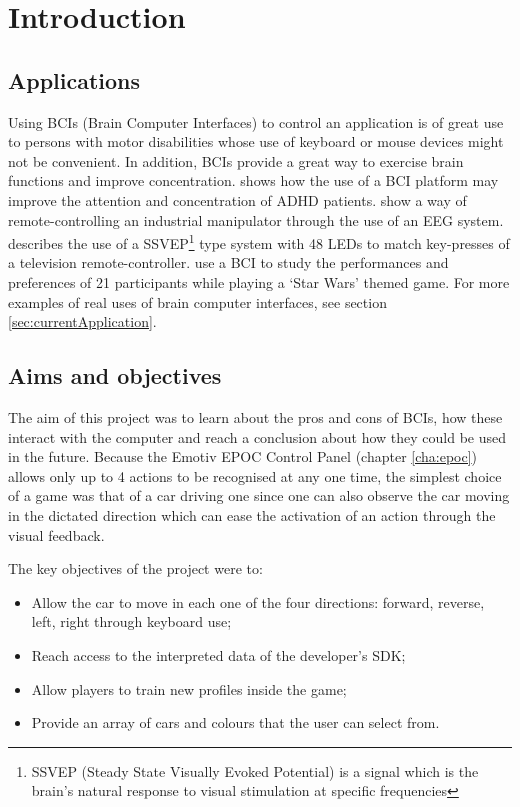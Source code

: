 \chapter{Introduction}
\label{cha:intro}

\section{Applications}

Using BCIs (Brain Computer Interfaces) to control an application is of great use to persons with motor disabilities whose use of keyboard or mouse devices might not be convenient. In addition,  BCIs provide a great way to exercise brain functions and improve concentration. \cite{adhd} shows how the use of a BCI platform may improve the attention and concentration of ADHD patients. \cite{manipulator} show a way of remote-controlling an industrial manipulator through the use of an EEG system. \cite{remotecontroller} describes the use of a SSVEP\footnote{SSVEP (Steady State Visually Evoked Potential) is a signal which is the brain's natural response to visual stimulation at specific frequencies} type system with 48 LEDs to match key-presses of a television remote-controller. \cite{exhibition} use a BCI to study the performances and preferences of 21 participants while playing a `Star Wars' themed game. For more examples of real uses of brain computer interfaces, see section \ref{sec:currentApplication}.

\section{Aims and objectives}

The aim of this project was to learn about the pros and cons of BCIs, how these interact with the computer and reach a conclusion about how they could be used in the future. Because the Emotiv EPOC Control Panel (chapter \ref{cha:epoc}) allows only up to 4 actions to be recognised at any one time, the simplest choice of a game was that of a car driving one since one can also observe the car moving in the dictated direction which can ease the activation of an action through the visual feedback.

The key objectives of the project were to:
\begin{itemize}
	\item Allow the car to move in each one of the four directions: forward, reverse, left, right through keyboard use; 
	\item Reach access to the interpreted data of the developer's SDK;
	\item Allow players to train new profiles inside the game;
	\item Provide an array of cars and colours that the user can select from.
\end{itemize}

